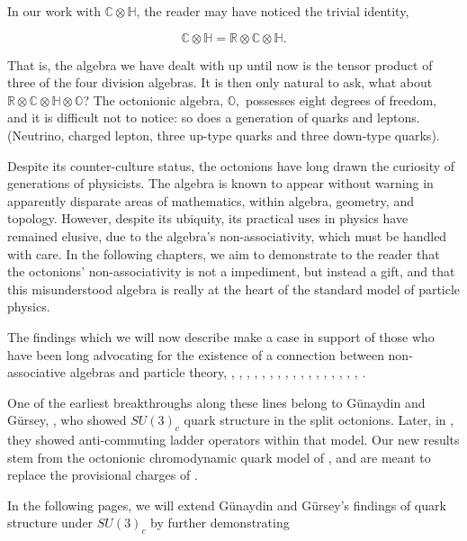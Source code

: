 \documentclass[letterpaper,12pt,titlepage,oneside,final]{book}
\newcommand{\CH}{\mathbb{C}\otimes\mathbb{H}}
\newcommand{\RCHO}{\mathbb{R}\otimes\mathbb{C}\otimes\mathbb{H}\otimes\mathbb{O}}
\begin{document}
In our work with $\CH$, the reader may have noticed the trivial identity, 

\begin{equation} \CH = \mathbb{R}\otimes\CH. \end{equation} 

\noindent That is, the algebra we have dealt with up until now is the tensor product of three of the four division algebras.  It is then only natural to ask,  what about $\RCHO$?  The octonionic algebra, $\mathbb{O},$ possesses eight degrees of freedom, and it is difficult not to notice: so does a generation of quarks and leptons.  (Neutrino, charged lepton, three up-type quarks and three down-type quarks).

Despite its counter-culture status, the octonions have long drawn the curiosity of generations of physicists.  The algebra is known to appear without warning in apparently disparate areas of mathematics, within algebra, geometry, and topology.  However, despite its ubiquity, its practical uses in physics have remained elusive, due to the algebra's non-associativity, which must be handled with care.  In the following chapters, we aim to demonstrate to the reader that the octonions' non-associativity is not a impediment, but instead a gift, and that this misunderstood algebra is really at the heart of the standard model of particle physics. 





The findings which we will now describe make a case in support of those who have been long advocating for the existence of a connection between non-associative algebras and particle theory, \cite{GGquarks}, \cite{GGstats}, \cite{adreams}, \cite{okubo}, \cite{dixon}, \cite{matter}, \cite{UTI}, \cite{Gen}, \cite{qq},  \cite{boylefar}, \cite{mth}, \cite{magic} \cite{jjI}, \cite{jjII}, \cite{jjIII}, \cite{jjIV}, \cite{e6md}, \cite{Grass}, \cite{wow}.  

One of the earliest breakthroughs along these lines belong to G\"{u}naydin and G\"{u}rsey, \cite{GGquarks}, who showed $SU(3)_c$ quark structure in the split octonions.  Later, in \cite{GGstats}, they  showed anti-commuting ladder operators within that model.  Our new results stem from the octonionic chromodynamic quark model of \cite{GGstats}, and are meant to replace the provisional charges of \cite{UTI}.   

In the following pages, we will extend G\"{u}naydin and G\"{u}rsey's findings of quark structure under $SU(3)_c$ by further demonstrating 
\end{document}
